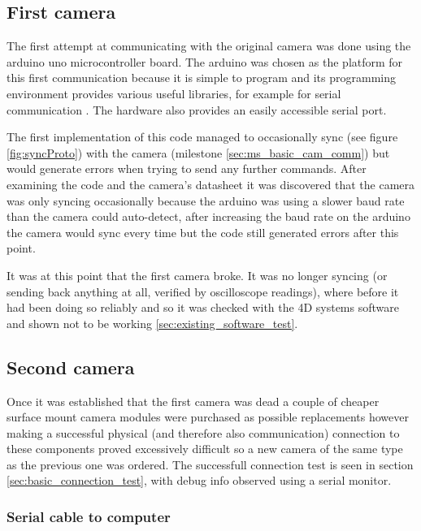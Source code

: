 \subsection{First camera}
\label{sec:cam_prob}
The first attempt at communicating with the original camera was done using the arduino uno microcontroller board. The arduino was chosen as the platform for this first communication because it is simple to program and its programming environment provides various useful libraries, for example for serial communication \cite{arduino_serial_library}. The hardware also provides an easily accessible serial port.

The first implementation of this code managed to occasionally sync (see figure \ref{fig:syncProto}) with the camera (milestone \ref{sec:ms_basic_cam_comm}) but would generate errors when trying to send any further commands. After examining the code and the camera's datasheet it was discovered that the camera was only syncing occasionally because the arduino was using a slower baud rate than the camera could auto-detect, after increasing the baud rate on the arduino the camera would sync every time but the code still generated errors after this point.

It was at this point that the first camera broke. It was no longer syncing (or sending back anything at all, verified by oscilloscope readings), where before it had been doing so reliably and so it was checked with the 4D systems software and shown not to be working \ref{sec:existing_software_test}.

\subsection{Second camera}

Once it was established that the first camera was dead a couple of cheaper surface mount camera modules were purchased as possible replacements however making a successful physical (and therefore also communication) connection to these components proved excessively difficult so a new camera of the same type as the previous one \cite{ucam_datasheet} was ordered. The successfull connection test is seen in section \ref{sec:basic_connection_test}, with debug info observed using a serial monitor.

\subsubsection{Serial cable to computer}

